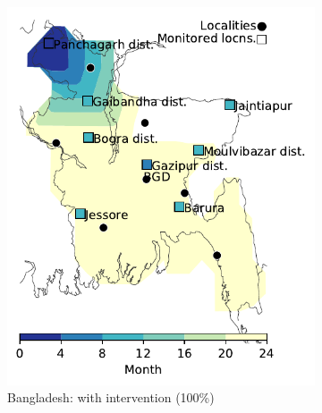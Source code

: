 \documentclass[10pt]{article}
\theoremstyle{definition}
\begin{document}
\begin{figure}[!ht]
\begin{subfigure}[b]{.28\textwidth}
\includegraphics[width=\textwidth]{../cellular_automata/results/contour/BD_model-B_precip1-out-100_m1_l3.pdf}
\caption{Bangladesh: with intervention (100\%)\label{fig:bgdBContourInt}}
\end{subfigure}
\begin{subfigure}[b]{.28\textwidth}

\end{subfigure}
\end{figure}
\end{document}
